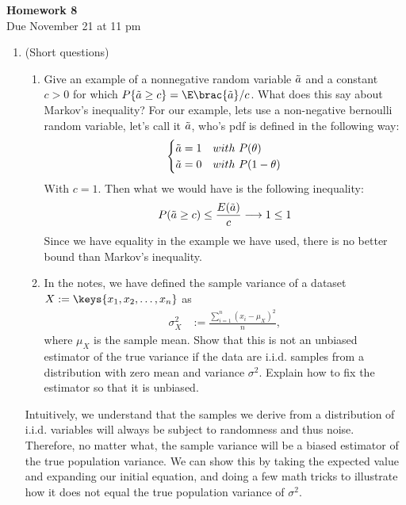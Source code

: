 \documentclass[12pt,twoside]{article}
\newcommand{\rnd}{\Tilde  }
\newcommand{\ra}{\rnd{ a}  }
\begin{document}
\begin{center}
{\large{\textbf{Homework 8}} } \\%
Due November 21 at 11 pm
\\
\end{center}

\begin{enumerate}

\item (Short questions) 
\begin{enumerate}
\item Give an example of a nonnegative random variable $\ra$ and a constant $c > 0$ for which $P\{\ra \geq c\} = \E\brac{ \ra }/c$. What does this say about Markov's inequality?
\subitem
For our example, lets use a non-negative bernoulli random variable, let's call it $\ra$, who's pdf is defined in the following way:
$$
    \begin{cases}
    \ra = 1 & with \ P(\theta) \\
    \ra = 0 & with \ P(1-\theta)
    \end{cases}
$$
With $c=1$. Then what we would have is the following inequality:
$$
    P(\ra \geq c) \leq \frac{E(\ra)}{c} \longrightarrow 1 \leq 1 
$$
Since we have equality in the example we have used, there is no better bound than Markov's inequality.

\item In the notes, we have defined the sample variance of a dataset $X := \keys{x_1, x_2, \ldots, x_n}$ as
 \begin{align}
\sigma_{X}^2 &:= \frac{ \sum_{i=1}^{n}  (x_i - \mu_X)^2}{n},
\end{align}
where $\mu_X$ is the sample mean. Show that this is not an unbiased estimator of the true variance if the data are i.i.d. samples from a distribution with zero mean and variance $\sigma^2$. Explain how to fix the estimator so that it is unbiased.
\end{enumerate}
\subitem Intuitively, we understand that the samples we derive from a distribution of i.i.d. variables will always be subject to randomness and thus noise. Therefore, no matter what, the sample variance will be a biased estimator of the true population variance. We can show this by taking the expected value and expanding our initial equation, and doing a few math tricks to illustrate how it does not equal the true population variance of $\sigma^2$.


\end{enumerate}
\end{document}
